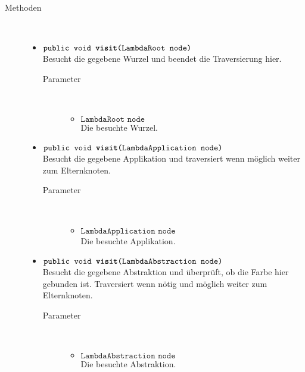 \begin{description}
\item[Methoden] \hfill \\
	\vspace{-.8cm}
	\begin{itemize}
		\item $\texttt{public void \textbf{visit}(LambdaRoot node)}$ \\ Besucht die gegebene Wurzel und beendet die Traversierung hier.
		\begin{description}
			\item[Parameter] \hfill \\
			\vspace{-.8cm}
			\begin{itemize}
				\item $\texttt{LambdaRoot node}$ \\ Die besuchte Wurzel.
			\end{itemize}
		\end{description}
				
		\item $\texttt{public void \textbf{visit}(LambdaApplication node)}$ \\ Besucht die gegebene Applikation und traversiert wenn möglich weiter zum Elternknoten.
		\begin{description}
			\item[Parameter] \hfill \\
			\vspace{-.8cm}
			\begin{itemize}
				\item $\texttt{LambdaApplication node}$ \\ Die besuchte Applikation.
			\end{itemize}
		\end{description}
		
		\item $\texttt{public void \textbf{visit}(LambdaAbstraction node)}$ \\ Besucht die gegebene Abstraktion und überprüft, ob die Farbe hier gebunden ist. Traversiert wenn nötig und möglich weiter zum Elternknoten.
		\begin{description}
			\item[Parameter] \hfill \\
			\vspace{-.8cm}
			\begin{itemize}
				\item $\texttt{LambdaAbstraction node}$ \\ Die besuchte Abstraktion.
			\end{itemize}
		\end{description}
		

\end{itemize}
\end{description}
